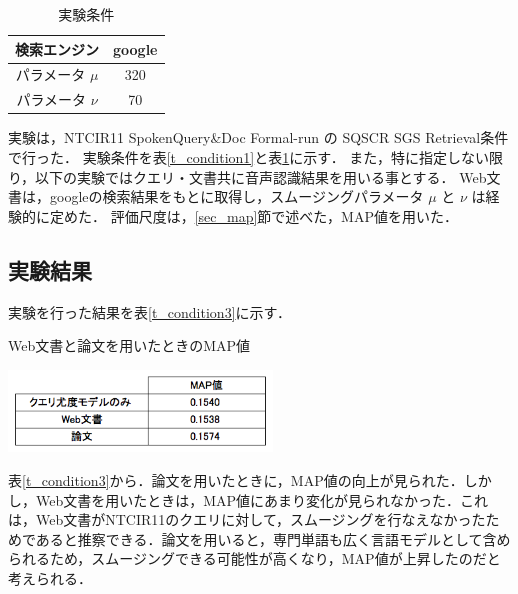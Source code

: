 \begin{table}[htbp]
    \begin{center}
        \caption{実験条件}
        \begin{tabular}{|c|c|}
            \hline
            検索エンジン & google \\ \hline
            パラメータ $\mu$ & 320 \\ \hline
            パラメータ $\nu$ & 70 \\ \hline
        \end{tabular}
        \label{t_condition2}
    \end{center}
\end{table}

実験は，NTCIR11 SpokenQuery\&Doc Formal-run の SQSCR SGS Retrieval条件で行った．
実験条件を表\ref{t_condition1}と表\ref{t_condition2}に示す．
また，特に指定しない限り，以下の実験ではクエリ・文書共に音声認識結果を用いる事とする．
Web文書は，googleの検索結果をもとに取得し，スムージングパラメータ $\mu$ と $\nu$ は経験的に定めた．
評価尺度は，\ref{sec_map}節で述べた，MAP値を用いた．

\subsection{実験結果}
実験を行った結果を表\ref{t_condition3}に示す．

\begin{table}[htbp]
    \centering
    \caption{Web文書と論文を用いたときのMAP値}
    \includegraphics[width=7cm]{./image/t_condition.png}
    \label{t_condition3}
\end{table}

表\ref{t_condition3}から．論文を用いたときに，MAP値の向上が見られた．しかし，Web文書を用いたときは，MAP値にあまり変化が見られなかった．これは，Web文書がNTCIR11のクエリに対して，スムージングを行なえなかったためであると推察できる．論文を用いると，専門単語も広く言語モデルとして含められるため，スムージングできる可能性が高くなり，MAP値が上昇したのだと考えられる．


